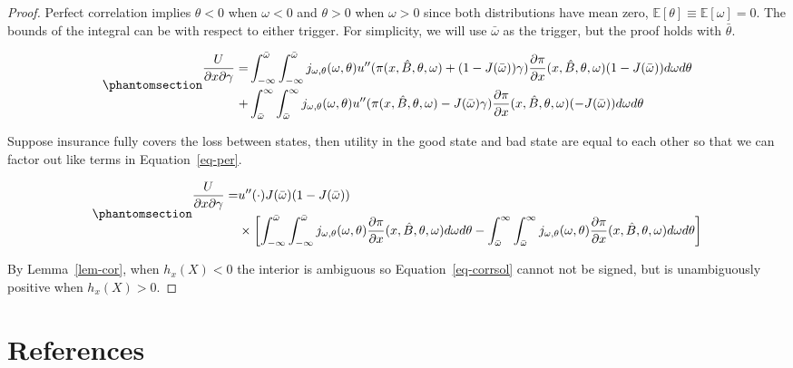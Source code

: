 \documentclass[
  letterpaper,
  DIV=11,
  numbers=noendperiod]{scrartcl}
\theoremstyle{plain}
\theoremstyle{plain}
\theoremstyle{remark}
\begin{document}
\begin{proof}
Perfect correlation implies \(\theta<0\) when \(\omega<0\) and
\(\theta>0\) when \(\omega>0\) since both distributions have mean zero,
\(\mathbb{E}[\theta]\equiv\mathbb{E}[\omega]=0\). The bounds of the
integral can be with respect to either trigger. For simplicity, we will
use \(\bar\omega\) as the trigger, but the proof holds with
\(\bar\theta\).

\begin{equation}\phantomsection\label{eq-per}{
\begin{aligned}
\frac{U}{\partial x \partial \gamma}=&\int^{\bar\omega}_{-\infty} \int^{\bar\omega}_{-\infty}j_{\omega,\theta}(\omega,\theta)u''(\pi(x,\hat{B},\theta,\omega)+(1-J(\bar\omega))\gamma)\frac{\partial \pi}{\partial x}(x,\hat{B},\theta,\omega)(1-J(\bar\omega))d\omega d\theta\\
+&\int^{\infty}_{\bar\omega}\int^{\infty}_{\bar{\omega}}j_{\omega,\theta}(\omega,\theta) u''(\pi(x,\hat{B},\theta,\omega)-J(\bar\omega)\gamma)\frac{\partial \pi}{\partial x}(x,\hat{B},\theta,\omega)(-J(\bar\omega))d\omega d\theta
\end{aligned}
}\end{equation}

Suppose insurance fully covers the loss between states, then utility in
the good state and bad state are equal to each other so that we can
factor out like terms in Equation~\ref{eq-per}.

\begin{equation}\phantomsection\label{eq-corrsol}{
\begin{aligned}
\frac{U}{\partial x \partial \gamma}=&u''(\cdot)J(\bar\omega)(1-J(\bar\omega))\\
&\times\left[\int^{\bar\omega}_{-\infty} \int^{\bar\omega}_{-\infty}j_{\omega,\theta}(\omega,\theta)\frac{\partial \pi}{\partial x}(x,\hat{B},\theta,\omega)d\omega d\theta
-\int^{\infty}_{\bar\omega}\int^{\infty}_{\bar{\omega}}j_{\omega,\theta}(\omega,\theta) \frac{\partial \pi}{\partial x}(x,\hat{B},\theta,\omega)d\omega d\theta\right]
\end{aligned}
}\end{equation}

By Lemma~\ref{lem-cor}, when \(h_x(X)<0\) the interior is ambiguous so
Equation~\ref{eq-corrsol} cannot not be signed, but is unambiguously
positive when \(h_x(X)>0\).
\end{proof}

\section*{References}\label{references}
\end{document}
